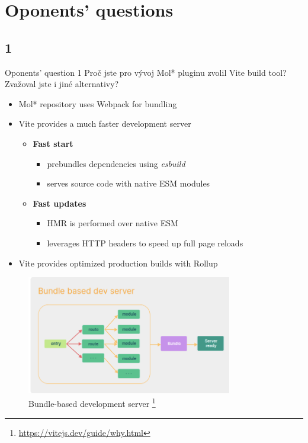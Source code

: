 \documentclass[
]{beamer}
\begin{document}
\section{Oponents' questions}

\subsection[1]{1}

\begin{frame}{}
  \begin{block}{Oponents' question 1}
    Proč jste pro vývoj Mol* pluginu zvolil Vite build tool? Zvažoval jste i jiné alternativy?
  \end{block}
  \begin{itemize}
    \item Mol* repository uses Webpack for bundling
    \item Vite provides a much faster development server
    \begin{itemize}
      \item \textbf{Fast start}
      \begin{itemize}
          \item prebundles dependencies using \textit{esbuild}
          \item serves source code with native ESM modules
      \end{itemize}
      \item \textbf{Fast updates}
      \begin{itemize}
          \item HMR is performed over native ESM
          \item leverages HTTP headers to speed up full page reloads
      \end{itemize}
    \end{itemize}
    \item Vite provides optimized production builds with Rollup
  \end{itemize}
\end{frame}

\begin{frame}
  \begin{figure}
    \includegraphics[width=0.8\textwidth,height=\textheight,keepaspectratio]{images/bundle_dev_server.png}
    \caption{Bundle-based development server
    \footnote{\url{https://vitejs.dev/guide/why.html}}
  }
  \end{figure}
\end{frame}
\end{document}
